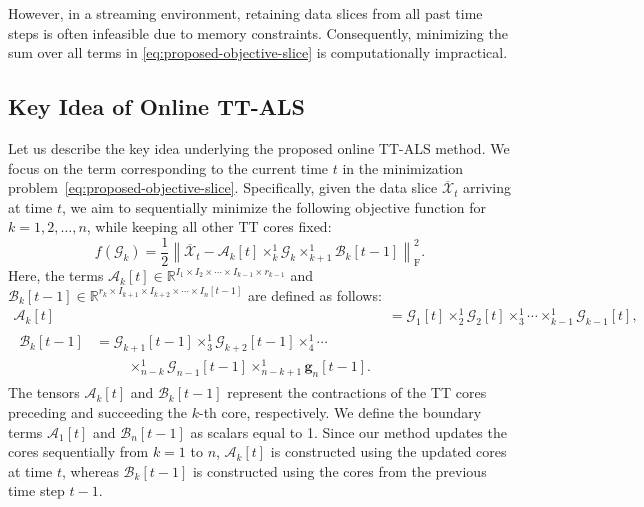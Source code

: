 \documentclass[a4paper, 11pt]{article}
\newcommand{\ttimes}[2]{\times_{#1}^{#2}}
\theoremstyle{plain}
\theoremstyle{definition}
\theoremstyle{remark}
\begin{document}
However, in a streaming environment, retaining data slices from all past time steps is often infeasible due to memory constraints.
Consequently, minimizing the sum over all terms in \eqref{eq:proposed-objective-slice} is computationally impractical.


\subsection{Key Idea of Online TT-ALS}
Let us describe the key idea underlying the proposed online TT-ALS method.
We focus on the term corresponding to the current time $t$ in the minimization problem~\eqref{eq:proposed-objective-slice}.
Specifically, given the data slice $\overline{\mathcal{X}}_t$ arriving at time $t$, we aim to sequentially minimize the following objective function for $k=1, 2, \ldots, n$, while keeping all other TT cores fixed:
\begin{equation}
    f(\mathcal{G}_k) = \frac{1}{2}\left\| \overline{\mathcal{X}}_t - \mathcal{A}_k[t] \ttimes{k}{1} \mathcal{G}_k \ttimes{k+1}{1} \mathcal{B}_k[t-1] \right\|_\mathrm{F}^2. \label{eq:proposed-objective}
\end{equation}
Here, the terms $\mathcal{A}_k[t] \in \mathbb{R}^{I_1 \times I_2 \times \cdots \times I_{k-1} \times r_{k-1}}$ and $\mathcal{B}_k[t-1] \in \mathbb{R}^{r_k \times I_{k+1} \times I_{k+2} \times \cdots \times I_n[t-1]}$ are defined as follows:
\begin{align*}
    \mathcal{A}_k[t] &= \mathcal{G}_1[t] \ttimes{2}{1} \mathcal{G}_2[t] \ttimes{3}{1} \cdots \ttimes{k-1}{1} \mathcal{G}_{k-1}[t], \\
    \begin{split}
        \mathcal{B}_k[t-1] &= \mathcal{G}_{k+1}[t-1] \ttimes{3}{1} \mathcal{G}_{k+2}[t-1] \ttimes{4}{1} \cdots \\
        &\phantom{=}\quad \ttimes{n-k}{1} \mathcal{G}_{n-1}[t-1] \ttimes{n-k+1}{1} \bm{g}_n[t-1].
    \end{split}
\end{align*}
The tensors $\mathcal{A}_k[t]$ and $\mathcal{B}_k[t-1]$ represent the contractions of the TT cores preceding and succeeding the $k$-th core, respectively.
We define the boundary terms $\mathcal{A}_1[t]$ and $\mathcal{B}_n[t-1]$ as scalars equal to 1.
Since our method updates the cores sequentially from $k=1$ to $n$, $\mathcal{A}_k[t]$ is constructed using the updated cores at time $t$, whereas $\mathcal{B}_k[t-1]$ is constructed using the cores from the previous time step $t-1$.
\end{document}
